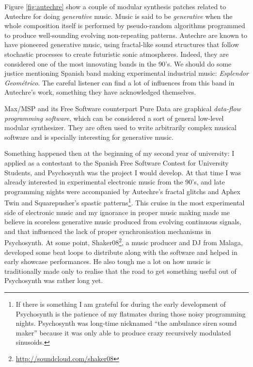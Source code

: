 \begin{mynote}
  Figure \ref{fig:autechre} show a couple of modular synthesis patches
  related to Autechre for doing \emph{generative} music.  Music is
  said to be \emph{generative} when the whole composition itself is
  performed by pseudo-random algorithms programmed to produce
  well-sounding evolving non-repeating patterns. Autechre are known to
  have pioneered generative music, using fractal-like sound structures
  that follow stochastic processes to create futuristic sonic
  atmospheres. Indeed, they are considered one of the most innovating
  bands in the 90's. We should do some justice mentioning Spanish band
  making experimental industrial music: \emph{Esplendor Geométrico}. The
  careful listener can find a lot of influences from this band in
  Autechre's work, something they have acknowledged themselves.

  Max/MSP and its Free Software counterpart Pure
  Data are graphical \emph{data-flow programming
    software}, which can be considered a sort of general low-level
  modular synthesizer. They are often used to write arbitrarily
  complex musical software and is specially interesting for generative
  music. 
\end{mynote}

Something happened then at the beginning of my second year of
university: I applied as a contestant to the Spanish Free Software
Contest for University Students, and Psychosynth was the project I
would develop. At that time I was already interested in experimental
electronic music from the 90's, and late programming nights were
accompanied by Autechre's fractal glitchs and Aphex Twin and
Squarepusher's spastic patterns\footnote{If there is something I am
  grateful for during the early development of Psychosynth is the
  patience of my flatmates during those noisy programming
  nights. Psychosynth was long-time nicknamed ``the ambulance siren
  sound maker'' because it was only able to produce crazy recursively
  modulated sinusoids.}. This cruise in the most experimental side of
electronic music and my ignorance in proper music making made me
believe in scoreless generative music produced from evolving
continuous signals, and that influenced the lack of proper
synchronisation mechanisms in Psychosynth. At some point,
Shaker08\footnote{\url{http://soundcloud.com/shaker08}}, a music
producer and DJ from Malaga, developed some beat loops to distribute
along with the software and helped in early showcase performances. He
also tough me a lot on how music is traditionally made only to realise
that the road to get something useful out of Psychosynth was rather
long yet.

